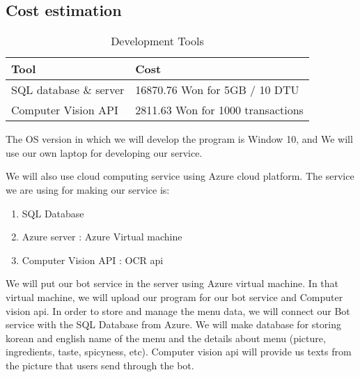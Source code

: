 \subsection{Cost estimation}
\begin{table}[htb]
\caption{Development Tools}
\begin{tabularx}{\linewidth}{|X|X|}
\toprule
Tool & Cost \\
\midrule
SQL database \& server & 16870.76 Won  for 5GB / 10 DTU\\
Computer Vision API & 2811.63 Won for 1000 transactions\\
\end{tabularx}
\end{table}
\FloatBarrier

The OS version in which we will develop the program is Window 10, and We will use our own laptop for developing our service.

We will also use cloud computing service using Azure cloud platform. 
The service we are using for making our service is:
\begin{enumerate}
\item SQL Database 
\item Azure server : Azure Virtual machine
\item Computer Vision API : OCR api
\end{enumerate}
We will put our bot service in the server using Azure virtual machine. In that virtual machine, we will upload our program for our bot service and Computer vision api.  
In order to store and manage the menu data, we will connect our Bot service with the SQL Database from Azure. We will make database for storing korean and english name of the menu and the details about menu (picture, ingredients, taste, spicyness, etc).
Computer vision api will provide us texts from the picture that users send through the bot.
